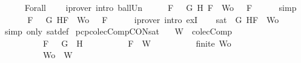 \begin{isabellebody}
\ \ \ \ \isamarkupfalse%
\ Forall{}\ {}\ {}\ \isamarkupfalse%
\ {\isacharparenleft}iprover\ intro{\isacharcolon}\ ball{\isacharunderscore}Un{\isacharparenright}\isanewline
\ \ \isamarkupfalse%
\ \isamarkupfalse%
\ {\isachardoublequoteopen}{\isasymforall}F\ {\isasymin}\ {\isacharparenleft}{\isacharbraceleft}\isactrlbold {\isasymnot}\ G{\isacharcomma}\isactrlbold {\isasymnot}\ H{\isacharcomma}\ F{\isacharbraceright}\ {\isasymunion}\ Wo{\isacharparenright}{\isachardot}\ {\isasymA}\ {\isasymTurnstile}\ F{\isachardoublequoteclose}\isanewline
\ \ \ \ \isamarkupfalse%
\ simp\isanewline
\ \ \isamarkupfalse%
\ \isamarkupfalse%
\ {\isachardoublequoteopen}{\isasymexists}{\isasymA}{\isachardot}\ {\isasymforall}F\ {\isasymin}\ {\isacharparenleft}{\isacharbraceleft}\isactrlbold {\isasymnot}\ G{\isacharcomma}\isactrlbold {\isasymnot}\ H{\isacharcomma}F{\isacharbraceright}\ {\isasymunion}\ Wo{\isacharparenright}{\isachardot}\ {\isasymA}\ {\isasymTurnstile}\ F{\isachardoublequoteclose}\isanewline
\ \ \ \ \isamarkupfalse%
\ {\isacharparenleft}iprover\ intro{\isacharcolon}\ exI{\isacharparenright}\isanewline
\ \ \isamarkupfalse%
\ {\isachardoublequoteopen}sat\ {\isacharparenleft}{\isacharbraceleft}\isactrlbold {\isasymnot}\ G{\isacharcomma}\isactrlbold {\isasymnot}\ H{\isacharcomma}F{\isacharbraceright}\ {\isasymunion}\ Wo{\isacharparenright}{\isachardoublequoteclose}\isanewline
\ \ \ \ \isamarkupfalse%
\ {\isacharparenleft}simp\ only{\isacharcolon}\ sat{\isacharunderscore}def{\isacharparenright}\isanewline
{}\isamarkupfalse%
%
\endisatagproof
{\isafoldproof}%
%
\isadelimproof
\isanewline
%
\endisadelimproof
\isanewline
{}\isamarkupfalse%
\ pcp{\isacharunderscore}colecComp{\isacharunderscore}CON{\isacharunderscore}sat{}{\isacharcolon}\isanewline
\ \ \ {\isachardoublequoteopen}W\ {\isasymin}\ colecComp{\isachardoublequoteclose}\isanewline
\ \ \ \ \ \ \ \ \ \ {\isachardoublequoteopen}F\ {\isacharequal}\ \isactrlbold {\isasymnot}\ {\isacharparenleft}G\ \isactrlbold {\isasymrightarrow}\ H{\isacharparenright}{\isachardoublequoteclose}\isanewline
\ \ \ \ \ \ \ \ \ \ {\isachardoublequoteopen}F\ {\isasymin}\ W{\isachardoublequoteclose}\isanewline
\ \ \ \ \ \ \ \ \ \ {\isachardoublequoteopen}finite\ Wo{\isachardoublequoteclose}\isanewline
\ \ \ \ \ \ \ \ \ \ {\isachardoublequoteopen}Wo\ {\isasymsubseteq}\ W{\isachardoublequoteclose}\isanewline

\end{isabellebody}
